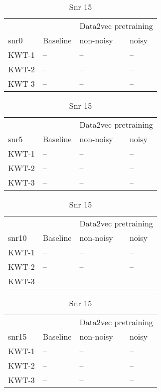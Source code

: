 \begin{table}[ht]
    \begin{subtable}[ht]{0.45\textwidth}
        \centering
        \begin{tabular}{@{}llll@{}}
        \toprule
        & & \multicolumn{2}{c}{Data2vec pretraining} \\ \cline{3-4}
        snr0    & Baseline & non-noisy & noisy \\ \midrule
        KWT-1    & --  & -- & -- \\
        KWT-2    & --  & -- & -- \\
        KWT-3    & --  & -- & -- \\
        \bottomrule
        \end{tabular}
        \caption{Snr 0}
    \end{subtable}
    \hfill
    \begin{subtable}[ht]{0.45\textwidth}
        \centering
        \begin{tabular}{@{}llll@{}}
        \toprule
        & & \multicolumn{2}{c}{Data2vec pretraining} \\ \cline{3-4}
        snr5    & Baseline & non-noisy & noisy \\ \midrule
        KWT-1    & --  & -- & -- \\
        KWT-2    & --  & -- & -- \\
        KWT-3    & --  & -- & -- \\
        \bottomrule
        \end{tabular}
        \caption{Snr 5}
    \end{subtable}


    \bigskip


    \begin{subtable}[ht]{0.45\textwidth}
        \centering
        \begin{tabular}{@{}llll@{}}
        \toprule
        & & \multicolumn{2}{c}{Data2vec pretraining} \\ \cline{3-4}
        snr10    & Baseline & non-noisy & noisy \\ \midrule
        KWT-1    & --  & -- & -- \\
        KWT-2    & --  & -- & -- \\
        KWT-3    & --  & -- & -- \\
        \bottomrule
        \end{tabular}
        \caption{Snr 10}
    \end{subtable}
    \hfill
    \begin{subtable}[ht]{0.45\textwidth}
        \centering
        \begin{tabular}{@{}llll@{}}
        \toprule
        & & \multicolumn{2}{c}{Data2vec pretraining} \\ \cline{3-4}
        snr15    & Baseline & non-noisy & noisy \\ \midrule
        KWT-1    & --  & -- & -- \\
        KWT-2    & --  & -- & -- \\
        KWT-3    & --  & -- & -- \\
        \bottomrule
        \end{tabular}
        \caption{Snr 15}
    \end{subtable}


\end{table}
